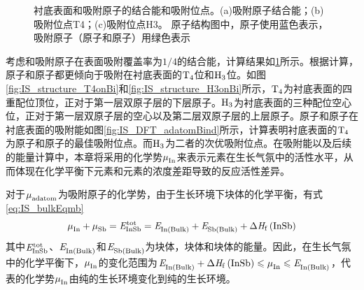 \begin{figure}[!b]
{    }
    \caption{衬底表面和吸附原子的结合能和吸附位点。(a)吸附原子结合能；(b)吸附位点T4；(c)吸附位点H3。 原子结构图中，原子使用蓝色表示，吸附原子（原子和原子）用绿色表示}
    \label{fig:IS_Bi_adatoms}
\end{figure}

考虑和吸附原子在表面吸附覆盖率为$1/ 4$的结合能，计算结果如\ref{fig:IS_Bi_adatoms}所示。根据计算，原子和原子都更倾向于吸附在衬底表面的$\rm T_{4} \it$位和$\rm H_{3} \it$位。如图\ref{fig:IS_structure_T4onBi}和\ref{fig:IS_structure_H3onBi}所示，$\rm T_{4} \it$为衬底表面的四重配位顶位，正对于第一层双原子层的下层原子。$\rm H_{3} \it$为衬底表面的三种配位空心位，正对于第一层双原子层的空心以及第二层双原子层的上层原子。原子和原子在衬底表面的吸附能如图\ref{fig:IS_DFT_adatomBind}所示，计算表明衬底表面的$\rm T_{4} \it$为原子和原子的最佳吸附位点。而$\rm H_{3} \it$为二者的次优吸附位点。在吸附能以及后续的能量计算中，本章将采用的化学势$\it \mu_{\rm In}^{\rm } \it$来表示元素在生长气氛中的活性水平，从而体现在化学平衡下元素和元素的浓度差距导致的反应活性差异。

对于$\it \mu_{\rm adatom}^{\rm } \it$为吸附原子的化学势，由于生长环境下块体的化学平衡，有式\eqref{eq:IS_bulkEqmb}\chinesecolon
\begin{equation}
    \label{eq:IS_bulkEqmb}
    \muVar{In}{}+\muVar{Sb}{}=\energyVar{InSb}{tot}=\energyVar{In\left(Bulk\right)}{}+\energyVar{Sb\left(Bulk\right)}{}+\rm{\Delta} \it H_{\rm f}\left(\ce{InSb}\right)
\end{equation}
其中$\it E_{\rm InSb}^{\rm tot} \it$、$\it E_{\rm In\left(Bulk\right)}^{\rm } \it$和$\it E_{\rm Sb\left(Bulk\right)}^{\rm } \it$为块体，块体和块体的能量。因此，在生长气氛中的化学平衡下，$\it \mu_{\rm In}^{\rm } \it$的变化范围为$ \energyVar{In\left(Bulk\right)}{}+\rm{\Delta} \it H_{\rm f}\left(\ce{InSb}\right) \leqslant \muVar{In}{} \leqslant \energyVar{In\left(Bulk\right)}{}$，代表的化学势$\it \mu_{\rm In}^{\rm } \it$由纯的生长环境变化到纯的生长环境。

